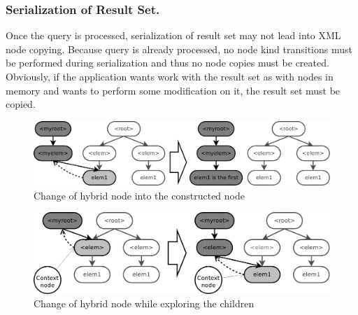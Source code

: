 \documentclass{llncs}
\begin{document}
\subsubsection{Serialization of Result Set.} Once the query is processed, serialization
of result set may not lead into XML node copying. Because query is already processed,
no node kind transitions must be performed during serialization and thus no node copies
must be created. Obviously, if the application wants work with the result set as with
nodes in memory and wants to perform some modification on it, the result set must 
be copied. 
   
\begin{figure}[ht]
    \begin{center}
        \includegraphics[scale=0.25]{hybrid_change}
        \caption{Change of hybrid node into the constructed node}
        \label{fig:hybridChange}
    \end{center}
\end{figure}

\begin{figure}[ht]
    \begin{center}
        \includegraphics[scale=0.25]{child_axis}
        \caption{Change of hybrid node while exploring the children}
        \label{fig:childAxis}
    \end{center}
\end{figure}
        


\end{document}
